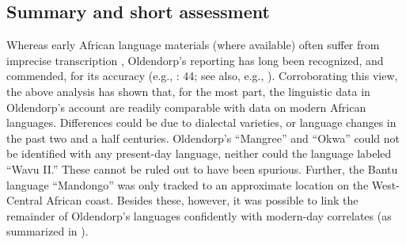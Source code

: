 \documentclass[output=paper,colorlinks,citecolor=brown]{langscibook}
\begin{document}
\subsection{Summary and short assessment}

Whereas early African language materials (where available) often suffer from imprecise transcription \citep[95--97]{Jones_1991}, Oldendorp's reporting has long been recognized, and commended, for its accuracy (e.g., \cite{Herskovits_1958}: 44; see also, e.g., \cite{Ahlback_2016}). Corroborating this view, the above analysis has shown that, for the most part, the linguistic data in Oldendorp's account are readily comparable with data on modern African languages. Differences could be due to dialectal varieties, or language changes in the past two and a half centuries. Oldendorp's ``Mangree'' and ``Okwa'' could not be identified with any present-day language, neither could the language \citet{Fodor_1975} labeled ``Wavu II.'' These cannot be ruled out to have been spurious. Further, the Bantu language ``Mandongo'' was only tracked to an approximate location on the West-Central African coast. Besides these, however, it was possible to link the remainder of Oldendorp's languages confidently with modern-day correlates (as summarized in ).
\end{document}
